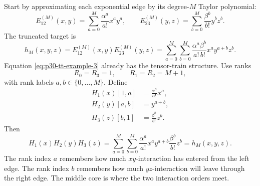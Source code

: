 \documentclass[11pt]{article}
\numberwithin{equation}{section}
\begin{document}
Start by approximating each exponential edge by its degree-\(M\) Taylor
polynomial:
\begin{equation}
    E_{12}^{(M)}(x,y)
    =
    \sum_{a=0}^{M}\frac{\alpha^a}{a!}x^ay^a,
    \qquad
    E_{23}^{(M)}(y,z)
    =
    \sum_{b=0}^{M}\frac{\beta^b}{b!}y^bz^b.
    \label{eq:p30-tt-example-2}
\end{equation}
The truncated target is
\begin{equation}
    h_M(x,y,z)
    =
    E_{12}^{(M)}(x,y)E_{23}^{(M)}(y,z)
    =
    \sum_{a=0}^{M}\sum_{b=0}^{M}
    \frac{\alpha^a\beta^b}{a!\,b!}
    x^a y^{a+b} z^b.
    \label{eq:p30-tt-example-3}
\end{equation}
Equation \eqref{eq:p30-tt-example-3} already has the tensor-train structure.
Use ranks
\[
    R_0=R_3=1,\qquad R_1=R_2=M+1,
\]
with rank labels \(a,b\in\{0,\ldots,M\}\).  Define
\begin{align}
    H_1(x)[1,a]
    &=
    \frac{\alpha^a}{a!}x^a,
    \label{eq:p30-tt-example-4}\\
    H_2(y)[a,b]
    &=
    y^{a+b},
    \label{eq:p30-tt-example-5}\\
    H_3(z)[b,1]
    &=
    \frac{\beta^b}{b!}z^b.
    \label{eq:p30-tt-example-6}
\end{align}
Then
\begin{equation}
    H_1(x)H_2(y)H_3(z)
    =
    \sum_{a=0}^{M}\sum_{b=0}^{M}
    \frac{\alpha^a}{a!}x^a
    y^{a+b}
    \frac{\beta^b}{b!}z^b
    =
    h_M(x,y,z).
    \label{eq:p30-tt-example-7}
\end{equation}
The rank index \(a\) remembers how much \(xy\)-interaction has entered from
the left edge.  The rank index \(b\) remembers how much \(yz\)-interaction will
leave through the right edge.  The middle core is where the two interaction
orders meet.
\end{document}
